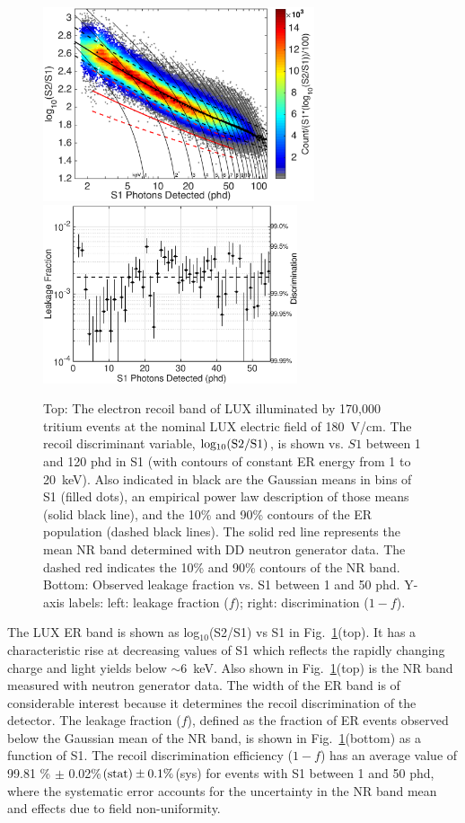 \begin{figure}[t!]
\includegraphics[width=80mm]{fig/fig11a.eps} %
\includegraphics[width=75mm]{fig/fig11b.eps}
\caption{Top: The electron recoil band of LUX illuminated by 170,000 tritium events at the nominal LUX electric field of 180~V/cm.  The recoil discriminant variable, $\rm log_{10}(S2/S1)$, is shown vs. $S1$ between 1 and 120 phd in S1 (with contours of constant ER energy from 1 to 20~keV). Also indicated in black are the Gaussian means in bins of S1 (filled dots), an empirical power law description of those means (solid black line), and the 10\% and 90\% contours of the ER population (dashed black lines). The solid red line represents the mean NR band determined with DD neutron generator data. The dashed red indicates the 10\% and 90\% contours of the NR band. Bottom: Observed leakage fraction vs. S1 between 1 and 50 phd. Y-axis labels: left: leakage fraction ($f$); right: discrimination ($1-f$).}
\label{fig:ER_band}
\end{figure}

The LUX ER band is shown as log$_{10}$(S2/S1) vs S1 in Fig.~\ref{fig:ER_band}(top).  It has a characteristic rise at decreasing values of S1 which reflects the rapidly changing charge and light yields below $\sim$6~keV.  Also shown in Fig.~\ref{fig:ER_band}(top) is the NR band measured with neutron generator data\cite{lux-reanalysis}. The width of the ER band is of considerable interest because it determines the recoil discrimination of the detector. The leakage fraction ($f$), defined as the fraction of ER events observed below the Gaussian mean of the NR band, is shown in Fig.~\ref{fig:ER_band}(bottom) as a function of S1. The recoil discrimination efficiency ($1-f$) has an average value of 99.81 \% $\pm$ 0.02\%$\rm (stat) \pm 0.1\%$(sys) for events with S1 between 1 and 50 phd, where the systematic error accounts for the uncertainty in the NR band mean and effects due to field non-uniformity.


